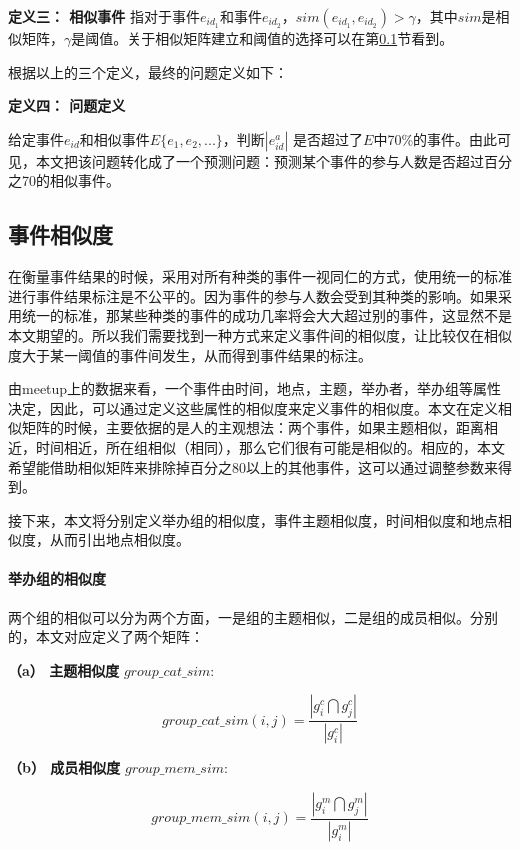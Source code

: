 \textbf{定义三： 相似事件}
指对于事件\(e_{id_1}\)和事件\(e_{id_2}\)，\(sim(e_{id_1},e_{id_2})>\gamma\)，其中\(sim\)是相似矩阵，\(\gamma\)是阈值。关于相似矩阵建立和阈值的选择可以在第\ref{s1-4}节看到。

根据以上的三个定义，最终的问题定义如下：
\newline

\textbf{定义四： 问题定义}

给定事件\(e_{id}\)和相似事件\(E\{e_1,e_2,...\}\)，判断\(|e_{id}^a|\)
是否超过了\(E\)中70\%的事件。由此可见，本文把该问题转化成了一个预测问题：预测某个事件的参与人数是否超过百分之70的相似事件。
\subsection{事件相似度}\label{s1-4}
在衡量事件结果的时候，采用对所有种类的事件一视同仁的方式，使用统一的标准进行事件结果标注是不公平的。因为事件的参与人数会受到其种类的影响。如果采用统一的标准，那某些种类的事件的成功几率将会大大超过别的事件，这显然不是本文期望的。所以我们需要找到一种方式来定义事件间的相似度，让比较仅在相似度大于某一阈值的事件间发生，从而得到事件结果的标注。

由meetup上的数据来看，一个事件由时间，地点，主题，举办者，举办组等属性决定，因此，可以通过定义这些属性的相似度来定义事件的相似度。本文在定义相似矩阵的时候，主要依据的是人的主观想法：两个事件，如果主题相似，距离相近，时间相近，所在组相似（相同），那么它们很有可能是相似的。相应的，本文希望能借助相似矩阵来排除掉百分之80以上的其他事件，这可以通过调整参数来得到。

接下来，本文将分别定义举办组的相似度，事件主题相似度，时间相似度和地点相似度，从而引出地点相似度。
\paragraph{举办组的相似度}
两个组的相似可以分为两个方面，一是组的主题相似，二是组的成员相似。分别的，本文对应定义了两个矩阵：

\textbf{（a） 主题相似度} \(group\_cat\_sim:\)

\begin{equation}
group\_cat\_sim(i,j)=\frac{|g_i^c\bigcap g_j^c|}{|g_i^c|}
\end{equation}


\textbf{（b） 成员相似度} \(group\_mem\_sim:\)

\begin{equation}
group\_mem\_sim(i,j)=\frac{|g_i^m\bigcap g_j^m|}{|g_i^m|}
\end{equation}

